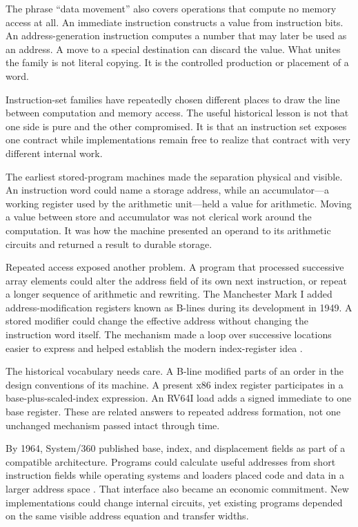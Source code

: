 The phrase ``data movement'' also covers operations that compute no memory
access at all. An immediate instruction constructs a value from instruction
bits. An address-generation instruction computes a number that may later be
used as an address. A move to a special destination can discard the value.
What unites the family is not literal copying. It is the controlled production
or placement of a word.

\begin{archive}[title={The load/store boundary is a design choice}]
Instruction-set families have repeatedly chosen different places to draw the
line between computation and memory access. The useful historical lesson is
not that one side is pure and the other compromised. It is that an instruction
set exposes one contract while implementations remain free to realize that
contract with very different internal work.
\end{archive}

The earliest stored-program machines made the separation physical and
visible. An instruction word could name a storage address, while an
accumulator---a working register used by the arithmetic unit---held a value
for arithmetic. Moving a value between store and accumulator was not clerical
work around the computation. It was how the
machine presented an operand to its arithmetic circuits and returned a result
to durable storage.

Repeated access exposed another problem. A program that processed successive
array elements could alter the address field of its own next instruction, or
repeat a longer sequence of arithmetic and rewriting. The Manchester Mark I
added address-modification registers known as B-lines during its development
in 1949. A stored modifier could change the effective address without changing
the instruction word itself. The mechanism made a loop over successive
locations easier to express and helped establish the modern index-register
idea \autocite{manchester2026mark1}.

The historical vocabulary needs care. A B-line modified parts of an order in
the design conventions of its machine. A present x86 index register participates
in a base-plus-scaled-index expression. An RV64I load adds a signed immediate
to one base register. These are related answers to repeated address formation,
not one unchanged mechanism passed intact through time.

By 1964, System/360 published base, index, and displacement fields as part of
a compatible architecture. Programs could calculate useful addresses from
short instruction fields while operating systems and loaders placed code and
data in a larger address space \autocite{amdahl1964system360,ibm1964system360principles}.
That interface also became an economic commitment. New implementations could
change internal circuits, yet existing programs depended on the same visible
address equation and transfer widths.

